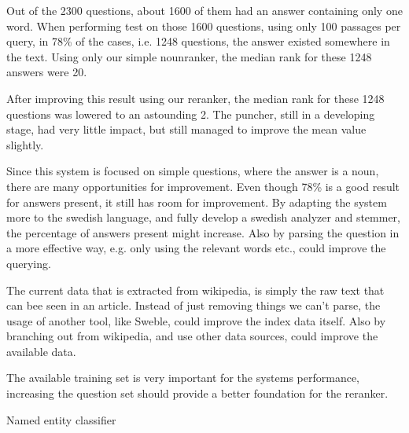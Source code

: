 Out of the 2300 questions, about 1600 of them had an answer containing only one word.
When performing test on those 1600 questions, using only 100 passages per query, 
in 78\% of the cases, i.e. 1248 questions, the answer existed somewhere in the text.
Using only our simple nounranker, the median rank for these 1248 answers were 20.

After improving this result using our reranker, the median rank for these 1248 questions was lowered to an astounding 2.
The puncher, still in a developing stage, had very little impact, but still managed to improve the mean value slightly.

Since this system is focused on simple questions, where the answer is a noun, there are many opportunities for improvement.
Even though 78\% is a good result for answers present, it still has room for improvement. By adapting the system more to the swedish language, 
and fully develop a swedish analyzer and stemmer, the percentage of answers present might increase.
Also by parsing the question in a more effective way, e.g. only using the relevant words etc., could improve the querying.

The current data that is extracted from wikipedia, is simply the raw text that can bee seen in an article. 
Instead of just removing things we can't parse, the usage of another tool, like Sweble, could improve the index data itself.
Also by branching out from wikipedia, and use other data sources, could improve the available data.

The available training set is very important for the systems performance, increasing the question set should provide a better foundation for the reranker.

Named entity classifier


